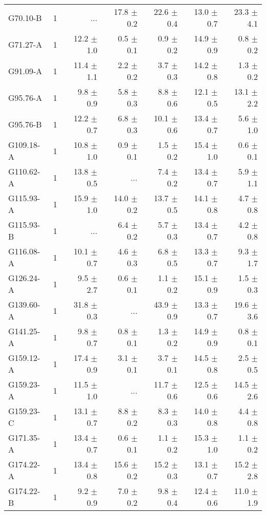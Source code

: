 \documentclass[printer]{aa}
\begin{document}
\begin{table*}[t]
\begin{tabular}{l l r r r r r}
G70.10-B & 1 &  ... & 17.8 $\pm$ 0.2 & 22.6 $\pm$ 0.4 & 13.0 $\pm$ 0.7 & 23.3 $\pm$  4.1 \\
G71.27-A & 1 & 12.2 $\pm$ 1.0 &  0.5 $\pm$ 0.1 &  0.9 $\pm$ 0.2 & 14.9 $\pm$ 0.9 &  0.8 $\pm$  0.2 \\
G91.09-A & 1 & 11.4 $\pm$ 1.1 &  2.2 $\pm$ 0.2 &  3.7 $\pm$ 0.3 & 14.2 $\pm$ 0.8 &  1.3 $\pm$  0.2 \\
G95.76-A & 1 &  9.8 $\pm$ 0.9 &  5.8 $\pm$ 0.3 &  8.8 $\pm$ 0.6 & 12.1 $\pm$ 0.5 & 13.1 $\pm$  2.2 \\
G95.76-B & 1 & 12.2 $\pm$ 0.7 &  6.8 $\pm$ 0.3 & 10.1 $\pm$ 0.6 & 13.4 $\pm$ 0.7 &  5.6 $\pm$  1.0 \\
G109.18-A & 1 & 10.8 $\pm$ 1.0 &  0.9 $\pm$ 0.1 &  1.5 $\pm$ 0.2 & 15.4 $\pm$ 1.0 &  0.6 $\pm$  0.1 \\
G110.62-A & 1 & 13.8 $\pm$ 0.5 &  ... &  7.4 $\pm$ 0.2 & 13.4 $\pm$ 0.7 &  5.9 $\pm$  1.1 \\
G115.93-A & 1 & 15.9 $\pm$ 1.0 & 14.0 $\pm$ 0.2 & 13.7 $\pm$ 0.5 & 14.1 $\pm$ 0.8 &  4.7 $\pm$  0.8 \\
G115.93-B & 1 &  ... &  6.4 $\pm$ 0.2 &  5.7 $\pm$ 0.3 & 13.4 $\pm$ 0.7 &  4.2 $\pm$  0.8 \\
G116.08-A & 1 & 10.1 $\pm$ 0.7 &  4.6 $\pm$ 0.3 &  6.8 $\pm$ 0.5 & 13.3 $\pm$ 0.7 &  9.3 $\pm$  1.7 \\
G126.24-A & 1 &  9.5 $\pm$ 2.7 &  0.6 $\pm$ 0.1 &  1.1 $\pm$ 0.2 & 15.1 $\pm$ 0.9 &  1.5 $\pm$  0.3 \\
G139.60-A & 1 & 31.8 $\pm$ 0.3 &  ... & 43.9 $\pm$ 0.9 & 13.3 $\pm$ 0.7 & 19.6 $\pm$  3.6 \\
G141.25-A & 1 &  9.8 $\pm$ 0.7 &  0.8 $\pm$ 0.1 &  1.3 $\pm$ 0.2 & 14.9 $\pm$ 0.9 &  0.8 $\pm$  0.1 \\
G159.12-A & 1 & 17.4 $\pm$ 0.9 &  3.1 $\pm$ 0.1 &  3.7 $\pm$ 0.1 & 14.5 $\pm$ 0.8 &  2.5 $\pm$  0.5 \\
G159.23-A & 1 & 11.5 $\pm$ 1.0 &  ...  & 11.7 $\pm$ 0.6 & 12.5 $\pm$ 0.6 & 14.5 $\pm$  2.6 \\
G159.23-C & 1 & 13.1 $\pm$ 0.7 &  8.8 $\pm$ 0.2 &  8.3 $\pm$ 0.3 & 14.0 $\pm$ 0.8 &  4.4 $\pm$  0.8 \\
G171.35-A & 1 & 13.4 $\pm$ 0.7 &  0.6 $\pm$ 0.1 &  1.1 $\pm$ 0.2 & 15.3 $\pm$ 1.0 &  1.1 $\pm$  0.2 \\
G174.22-A & 1 & 13.4 $\pm$ 0.8 & 15.6 $\pm$ 0.2 & 15.2 $\pm$ 0.3 & 13.1 $\pm$ 0.7 & 15.2 $\pm$  2.8 \\
G174.22-B & 1 &  9.2 $\pm$ 0.9 &  7.0 $\pm$ 0.2 &  9.8 $\pm$ 0.4 & 12.4 $\pm$ 0.6 & 11.0 $\pm$  1.9 \\

\end{tabular}
\end{table*}
\end{document}
